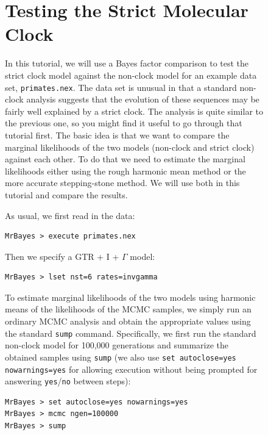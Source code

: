 \documentclass[12pt]{book}
\newcommand{\ttt}[1]{\texttt{#1}}
\begin{document}
\begin{figure}[h]
\section{Testing the Strict Molecular Clock}
\label{strictClock}

In this tutorial, we will use a Bayes factor comparison to test the strict clock model against the
non-clock model for an example data set, \ttt{primates.nex}. The data set is unusual in that a
standard non-clock analysis suggests that the evolution of these sequences may be fairly well
explained by a strict clock. The analysis is quite similar to the previous one, so you might find
it useful to go through that tutorial first. The basic idea is that we want to compare the marginal
likelihoods of the two models (non-clock and strict clock) against each other. To do that we need
to estimate the marginal likelihoods either using the rough harmonic mean method or the more
accurate stepping-stone method. We will use both in this tutorial and compare the results.

As usual, we first read in the data:

\begin{singlespacing}
\small
\begin{verbatim}
MrBayes > execute primates.nex
\end{verbatim}
\end{singlespacing}
\normalsize

Then we specify a GTR + I + $\Gamma$ model:

\begin{singlespacing}
\small
\begin{verbatim}
MrBayes > lset nst=6 rates=invgamma
\end{verbatim}
\end{singlespacing}
\normalsize

To estimate marginal likelihoods of the two models using harmonic means of the likelihoods of the
MCMC samples, we simply run an ordinary MCMC analysis and obtain the appropriate values using the
standard \ttt{sump} command. Specifically, we first run the standard non-clock model for 100,000
generations and summarize the obtained samples using \ttt{sump} (we also use \ttt{set autoclose=yes
nowarnings=yes} for allowing execution without being prompted for answering \ttt{yes}/\ttt{no}
between steps):

\begin{singlespacing}
\small
\begin{verbatim}
MrBayes > set autoclose=yes nowarnings=yes
MrBayes > mcmc ngen=100000
MrBayes > sump
\end{verbatim}
\end{singlespacing}
\normalsize


\end{figure}
\end{document}
